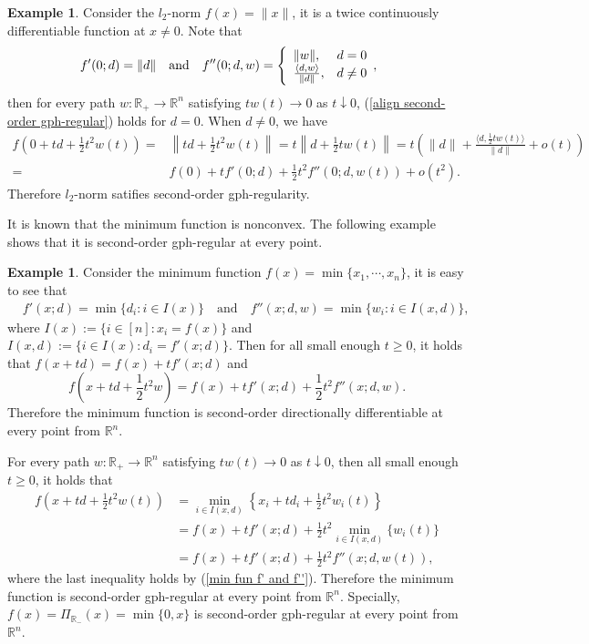 \documentclass[11pt]{article}
\theoremstyle{definition}
\newtheorem{example}[theorem]{Example}
\theoremstyle{remark}
\numberwithin{equation}{section}
\begin{document}
\begin{example}
  Consider the $l_2$-norm $f(x)=\|x\|$, it is a twice continuously differentiable function at
$x\neq 0$. Note that
\begin{align}%
     & f'(0;d)=\|d\|\quad\text{and}\quad
     f''(0;d,w)=\left\{\begin{array}{ll}
                                        \|w\|,& d=0 \\
                                       \frac{\langle d,w\rangle}{\|d\|},&  d\neq0
                                       \end{array},\right.\notag
  \end{align}
   then for every path $w:\mathbb{R}_{+}\to \mathbb{R}^n$ satisfying $tw(t)\to 0$ as $t\downarrow 0$,   (\ref{align second-order gph-regular}) holds for $d=0$. When $d\neq 0$, we have
 \begin{align*}
    f\left(0+td+\frac{1}{2}t^2w(t)\right)=& \left\|td+\frac{1}{2}t^2w(t)\right\|=t\left\|d+\frac{1}{2}tw(t)\right\|
    =t\left(\|d\|+\frac{\langle d,\frac{1}{2}tw(t)\rangle}{\|d\|}+o(t)\right)\\
    =&f(0)+tf'(0;d)+\frac{1}{2}t^2f''(0;d,w(t))+o(t^2).
 \end{align*}
   Therefore $l_2$-norm satifies  second-order gph-regularity.
\end{example}

It is known that the minimum function is nonconvex. The following example shows that it is  second-order gph-regular at every point.
\begin{example}\label{example min}
Consider the  minimum function  $f(x)=\min\{x_1,\cdots,x_n\}$, it is easy to see that
  \begin{align}\label{min fun f' and f''}
     & f'(x;d)=\min\{d_i: i\in I(x)\}\quad\text{and}\quad
     f''(x;d,w)=\min\{w_i: i\in I(x,d)\},
  \end{align}
where $I(x):=\{i\in[n]: x_i=f(x)\}$ and $I(x,d):=\{i\in I(x): d_i=f'(x;d)\}$.     Then for all small enough $t\ge0$, it holds that $f(x+td)=f(x)+tf'(x;d)$ and
$$f\left(x+td+\frac{1}{2}t^2 w\right) =f(x)+tf'(x;d)  +\frac{1}{2}t^2f''(x;d,w).$$
Therefore  the  minimum function
is second-order
directionally differentiable
 at every point from $\mathbb{R}^n$.

For every path $w:\mathbb{R}_{+}\to \mathbb{R}^n$ satisfying $tw(t)\to 0$ as $t\downarrow 0$,
then all small enough $t\ge0$, it holds that
\begin{align*}
  f\left(x+td+\frac{1}{2}t^2 w(t)\right) &=\min_{i\in I(x,d)}\left\{x_i+td_i+\frac{1}{2}t^2 w_i(t)\right\}\\
  &= f(x)+tf'(x;d)+\frac{1}{2}t^2\min_{i\in I(x,d)}\{w_i(t)\} \\
  &=f(x)+tf'(x;d)  +\frac{1}{2}t^2f''(x;d,w(t)),
\end{align*}
where the last inequality holds by (\ref{min fun f' and f''}).
Therefore  the  minimum function
is  second-order gph-regular at every point from $\mathbb{R}^n$. Specially, $f(x)=\Pi_{\mathbb{R}_{-}}(x)=\min\{0,x\}$ is second-order gph-regular at every point from $\mathbb{R}^n$.
\end{example}
\end{document}
